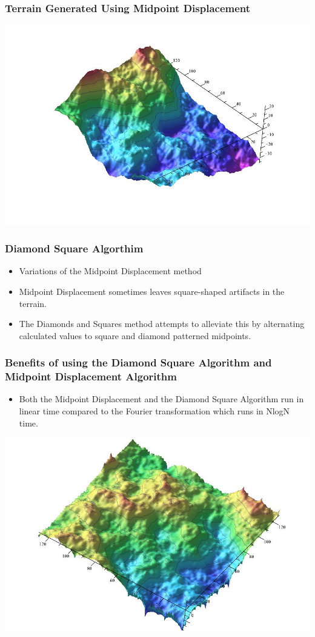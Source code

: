 \documentclass{beamer}
\begin{document}
\begin{frame}
\frametitle{Terrain Generated Using Midpoint Displacement}
\begin{center}
\includegraphics[scale=0.37]{midpoints.jpg}
\end{center}
\end{frame}

\begin{frame}
 \frametitle{Diamond Square Algorthim}
\begin{itemize}
\item Variations of the Midpoint Displacement method
\item Midpoint Displacement sometimes leaves square-shaped artifacts in the terrain. 
\item The Diamonds and Squares method attempts to alleviate this by alternating calculated values to square and diamond patterned midpoints. 
\end{itemize}
\end{frame}

\begin{frame}
\frametitle{Benefits of using the Diamond Square Algorithm and Midpoint Displacement Algorithm}
\begin{itemize}
\item Both the Midpoint Displacement and the Diamond Square Algorithm run in linear time compared to the Fourier transformation which runs in NlogN time.
\end{itemize}
\begin{center}
\includegraphics[scale=0.23]{diamondsandsquares.jpg}
\end{center}
\end{frame}
\end{document}
